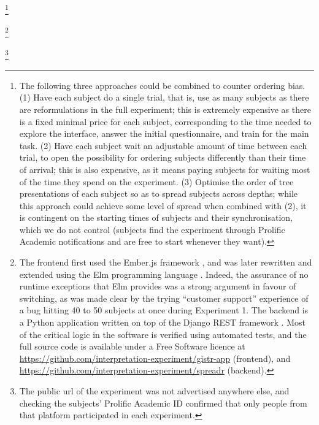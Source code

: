 \footnote{The
  following three approaches could be combined to counter ordering bias.
  (1) Have each subject do a single trial, that is, use as many subjects
  as there are reformulations in the full experiment; this is extremely
  expensive as there is a fixed minimal price for each subject,
  corresponding to the time needed to explore the interface, answer the
  initial questionnaire, and train for the main task. (2) Have each
  subject wait an adjustable amount of time between each trial, to open
  the possibility for ordering subjects differently than their time of
  arrival; this is also expensive, as it means paying subjects for
  waiting most of the time they spend on the experiment. (3) Optimise
  the order of tree presentations of each subject so as to spread
  subjects across depths; while this approach could achieve some level
  of spread when combined with (2), it is contingent on the starting
  times of subjects and their synchronisation, which we do not control
  (subjects find the experiment through Prolific Academic notifications
  and are free to start whenever they want).} 
  
  
  \footnote{The frontend first used the Ember.js framework
  \autocite{ember.js_contributors_ember.js:_2017}, and was later
  rewritten and extended using the Elm programming language
  \autocite{czaplicki_elm:_2017}. Indeed, the assurance of no runtime
  exceptions that Elm provides was a strong argument in favour of
  switching, as was made clear by the trying \enquote{customer support}
  experience of a bug hitting 40 to 50 subjects at once during
  Experiment 1. The backend is a Python application written on top of
  the Django REST framework \autocite{christie_django_2017}. Most of the
  critical logic in the software is verified using automated tests, and
  the full source code is available under a Free Software licence at
  \url{https://github.com/interpretation-experiment/gistr-app}
  (frontend), and
  \url{https://github.com/interpretation-experiment/spreadr} (backend).}

\footnote{The
  public url of the experiment was not advertised anywhere else, and
  checking the subjects' Prolific Academic ID confirmed that only people
  from that platform participated in each experiment.}